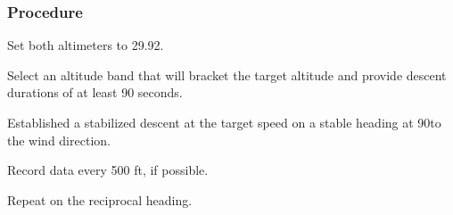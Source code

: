 % 
% 
%
 \subsubsection*{Procedure}
 \begin{compactenum}
   \item Set both altimeters to 29.92.
   \item Select an altitude band that will bracket the target altitude and provide descent durations of at least 90 seconds.
   \item Established a stabilized descent at the target speed on a stable heading at 90\textdegree to the wind direction.
   \item Record data every 500 ft, if possible.
   \item Repeat on the reciprocal heading.
   \end{compactenum}